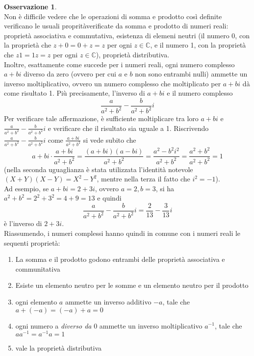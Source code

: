 \documentclass{book}
\theoremstyle{definition}
\newtheorem{oss}{Osservazione}[section]
\theoremstyle{plain}
\begin{document}
\begin{oss}
\begin{equation*}
  \end{equation*}
  Non è difficile vedere che le operazioni di somma e prodotto così definite verificano le usuali propritàverificate da somma e prodotto di numeri reali: proprietà associativa e commutativa, esistenza di elemeni neutri (il numero 0, con la proprietà che $z+0=0+z=z$ per ogni $z\in \mathds{C}$, e il numero 1, con la proprietà che $z1=1z=z$ per ogni $z\in \mathds{C}$), proprietà distributiva.\\
  Inoltre, esattamente come succede per i numeri reali, ogni numero complesso $a+bi$ diverso da zero (ovvero per cui $a$ e $b$ non sono entrambi nulli) ammette un inverso moltiplicativo, ovvero un numero complesso che moltiplicato per $a+bi$ dà come risultato 1. Più precisamente, l'inverso di $a+bi$ e il numero complesso
  \begin{equation*}
    \frac{a}{a^2+b^2}-\frac{b}{a^2+b^2}i
  \end{equation*}
  Per verificare tale affermazione, è sufficiente moltiplicare tra loro $a+bi$ e $\frac{a}{a^2+b^2}-\frac{b}{a^2+b^2}i$ e verificare che il risultato sia uguale a 1. Riscrivendo $\frac{a}{a^2+b^2}-\frac{b}{a^2+b^2}i$ come $\frac{a+bi}{a^2+b^2}$ si vede subito che
  \begin{equation*}
    a+bi\cdot \frac{a+bi}{a^2+b^2}= \frac{(a+bi)(a-bi)}{a^2+b^2}=\frac{a^2-b^2i^2}{a^2+b^2}=\frac{a^2+b^2}{a^2+b^2}=1
  \end{equation*}
  (nella seconda uguaglianza è stata utilizzata l'identità notevole $(X+Y)(X-Y)=X^2-Y^2$, mentre nella terza il fatto che $i^2=-1$).\\
  Ad esempio, se $a+bi=2+3i$, ovvero $a=2,b=3$, si ha $a^2+b^2=2^2+3^2=4+9=13$ e quindi
  \begin{equation*}
    \frac{a}{a^2+b^2}-\frac{b}{a^2+b^2}i=\frac{2}{13}-\frac{3}{13}i
  \end{equation*}
  \clearpage
  è l'inverso di $2+3i$.\\
  Riassumendo, i numeri complessi hanno quindi in comune con i numeri reali le sequenti proprietà:
  \begin{enumerate}
  \item La somma e il prodotto godono entrambi delle proprietà associativa e communitativa
  \item Esiste un elemento neutro per le somme e un elemento neutro per il prodotto
  \item ogni elemento $a$ ammette un inverso additivo $-a$, tale che $a+(-a)=(-a)+a=0$
  \item ogni numero a \textit{diverso da} 0 ammette un inverso moltiplicativo $a^{-1}$, tale che $aa^{-1}=a^{-1}a=1$
  \item vale la proprietà distributiva
  \end{enumerate}
\end{oss}
\end{document}
